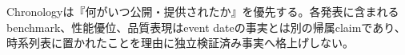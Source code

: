 \begin{claimboundary}
Chronologyは『何がいつ公開・提供されたか』を優先する。各発表に含まれるbenchmark、性能優位、品質表現はevent dateの事実とは別の帰属claimであり、時系列表に置かれたことを理由に独立検証済み事実へ格上げしない。\autocite{src-bc9a95ff1e00}
\end{claimboundary}
